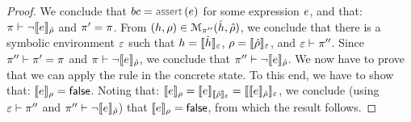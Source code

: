 \begin{proof}
\noindent{}
We conclude that  $\bcmd = \assert(\jsilexpr)$ for some expression $\jsilexpr$, and that: 
$\pc \vdash \neg\symbeval{\jsilexpr}{\sstore}$ and $\pc' = \pc$. 
From $(\heap, \store) \in \smodels{\sheap, \sstore}{\pc''}$, we conclude that there is a symbolic environment
$\senv$ such that $\heap = \semexpr{\sheap}{\senv}$, $\store = \semexpr{\sstore}{\senv}$, and 
$\senv \vdash \pc''$. Since $\pc'' \vdash \pc' = \pc$ and  $\pc \vdash \neg\symbeval{\jsilexpr}{\sstore}$, 
we conclude that $\pc'' \vdash \neg\symbeval{\jsilexpr}{\sstore}$.
We now have to prove that we can apply the  rule in the concrete state.
To this end, we have to show that: $\symbeval{\jsilexpr}{\store} = \jfalse$. 
Noting that:
$
  \symbeval{\jsilexpr}{\store} = \symbeval{\jsilexpr}{\symbeval{\sstore}{\senv}} 
         = \symbeval{\symbeval{\jsilexpr}{\sstore}}{\senv} 
$, we conclude (using $\senv \vdash \pc''$ and $\pc'' \vdash  \neg\symbeval{\jsilexpr}{\sstore}$) that 
$\symbeval{\jsilexpr}{\store} = \jfalse$, from which the result follows. 
\end{proof}


